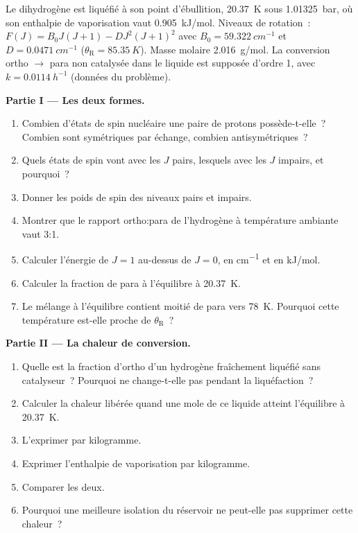 \begin{problem}
\label{pb:b3:statistical-thermo-applied:1}
Le dihydrogène est liquéfié à son point d'ébullition, \qty{20.37}{K}
sous \qty{1.01325}{bar}, où son
enthalpie de vaporisation vaut \qty{0.905}{kJ/mol}. Niveaux de
rotation~: $F(J) = B_0J(J+1) -
D J^2(J+1)^2$ avec $B_0 = \qty{59.322}{cm^{-1}}$ et $D = \qty{0.0471}{cm^{-1}}$ ($\theta_{\mathrm R} = \qty{85.35}{K}$).
Masse molaire \qty{2.016}{g/mol}. La conversion ortho $\to$ para non
catalysée dans le liquide
est supposée d'ordre 1, avec $k = \qty{0.0114}{h^{-1}}$ (données du
problème).

\medskip\noindent\textbf{Partie I --- Les deux formes.}
\begin{enumerate}
  \item Combien d'états de spin nucléaire une paire de protons
        possède-t-elle~? Combien sont symétriques par échange, combien
        antisymétriques~?
  \item Quels états de spin vont avec les $J$ pairs, lesquels avec les
        $J$ impairs, et pourquoi~?
  \item Donner les poids de spin des niveaux pairs et impairs.
  \item Montrer que le rapport ortho:para de l'hydrogène à température
        ambiante vaut 3:1.
  \item Calculer l'énergie de $J = 1$ au-dessus de $J = 0$, en
        \unit{cm^{-1}} et en
        \unit{kJ/mol}.
  \item Calculer la fraction de para à l'équilibre à \qty{20.37}{K}.
  \item Le mélange à l'équilibre contient moitié de para vers
        \qty{78}{K}. Pourquoi cette
        température est-elle proche de $\theta_{\mathrm R}$~?
\end{enumerate}

\medskip\noindent\textbf{Partie II --- La chaleur de conversion.}
\begin{enumerate}[resume]
  \item Quelle est la fraction d'ortho d'un hydrogène fraîchement liquéfié
        sans catalyseur~? Pourquoi ne change-t-elle pas pendant la
        liquéfaction~?
  \item Calculer la chaleur libérée quand une mole de ce liquide atteint
        l'équilibre à
        \qty{20.37}{K}.
  \item L'exprimer par kilogramme.
  \item Exprimer l'enthalpie de vaporisation par kilogramme.
  \item Comparer les deux.
  \item Pourquoi une meilleure isolation du réservoir ne peut-elle pas
        supprimer cette chaleur~?
\end{enumerate}


\end{problem}
